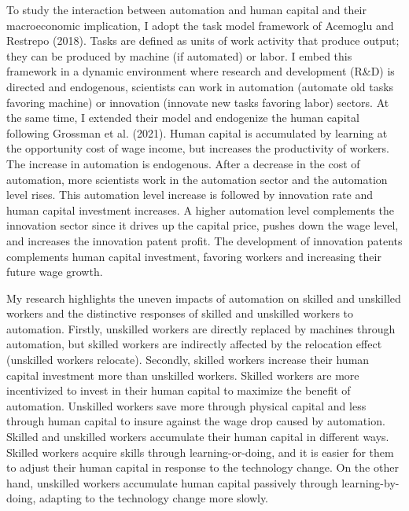 \documentclass[12pt]{article}
\begin{document}
To study the interaction between automation and human capital and their macroeconomic implication, I adopt the task model framework of Acemoglu and Restrepo (2018)\nocite{AcemogluRestrepo2018}. Tasks are defined as units of work activity that produce output; they can be produced by machine (if automated) or labor. I embed this framework in a dynamic environment where research and development (R\&D) is directed and endogenous, scientists can work in automation (automate old tasks favoring machine) or innovation (innovate new tasks favoring labor) sectors. At the same time, I extended their model and endogenize the human capital following Grossman et al. (2021)\nocite{Grossmanetal2021}. Human capital is accumulated by learning at the opportunity cost of wage income, but increases the productivity of workers. The increase in automation is endogenous. After a decrease in the cost of automation, more scientists work in the automation sector and the automation level rises. This automation level increase is followed by innovation rate and human capital investment increases. A higher automation level complements the innovation sector since it drives up the capital price, pushes down the wage level, and increases the innovation patent profit. The development of innovation patents complements human capital investment, favoring workers and increasing their future wage growth. 

My research highlights the uneven impacts of automation on skilled and unskilled workers and the distinctive responses of skilled and unskilled workers to automation. Firstly, unskilled workers are directly replaced by machines through automation, but skilled workers are indirectly affected by the relocation effect (unskilled workers relocate). Secondly, skilled workers increase their human capital investment more than unskilled workers. Skilled workers are more incentivized to invest in their human capital to maximize the benefit of automation. Unskilled workers save more through physical capital and less through human capital to insure against the wage drop caused by automation. Skilled and unskilled workers accumulate their human capital in different ways. Skilled workers acquire skills through learning-or-doing, and it is easier for them to adjust their human capital in response to the technology change. On the other hand, unskilled workers accumulate human capital passively through learning-by-doing, adapting to the technology change more slowly.  
\end{document}
